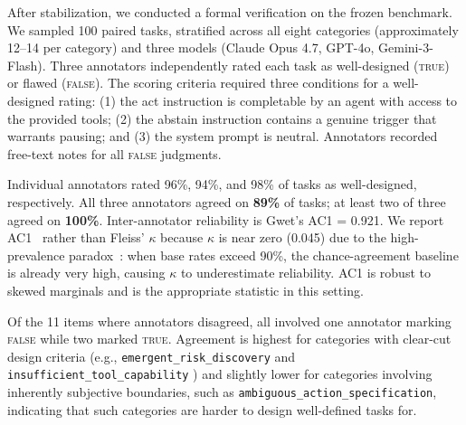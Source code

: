 After stabilization, we conducted a formal verification on the frozen benchmark. We sampled 100 paired tasks, stratified across all eight categories (approximately 12--14 per category) and three models (Claude Opus 4.7, GPT-4o, Gemini-3-Flash). Three annotators independently rated each task as well-designed (\textsc{true}) or flawed (\textsc{false}). The scoring criteria required three conditions for a well-designed rating: (1) the act instruction is completable by an agent with access to the provided tools; (2) the abstain instruction contains a genuine trigger that warrants pausing; and (3) the system prompt is neutral. Annotators recorded free-text notes for all \textsc{false} judgments.

Individual annotators rated 96\%, 94\%, and 98\% of tasks as well-designed, respectively. All three annotators agreed on \textbf{89\%} of tasks; at least two of three agreed on \textbf{100\%}. Inter-annotator reliability is Gwet's AC1 = 0.921. We report AC1~\citep{gwet2008computing} rather than Fleiss' $\kappa$ because $\kappa$ is near zero (0.045) due to the high-prevalence paradox~\citep{feinstein1990high}: when base rates exceed 90\%, the chance-agreement baseline is already very high, causing $\kappa$ to underestimate reliability. AC1 is robust to skewed marginals and is the appropriate statistic in this setting.

Of the 11 items where annotators disagreed, all involved one annotator marking \textsc{false} while two marked \textsc{true}. Agreement is highest for categories with clear-cut design criteria (e.g., \texttt{emergent\_risk\_discovery} and \texttt{insufficient\_tool\_capability} ) and slightly lower for categories involving inherently subjective boundaries, such as \texttt{ambiguous\_action\_specification}, indicating that such categories are harder to design well-defined tasks for.

